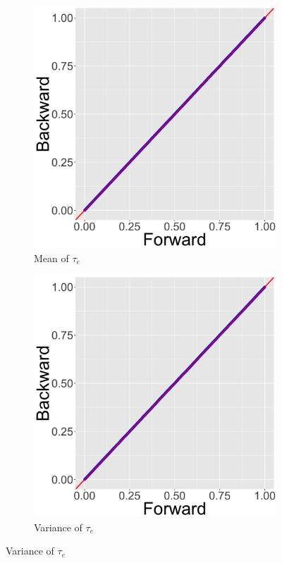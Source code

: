 \documentclass[ba]{imsart}
\numberwithin{equation}{section}
\theoremstyle{plain}
\begin{document}
\begin{figure}[!t]
\begin{subfigure}[b]{0.2425\textwidth}
			\end{subfigure}
			\begin{subfigure}[b]{0.2425\textwidth}
				\caption{Mean of $\tau_e$}
				\includegraphics[width=\textwidth]{img/plot3.png}	
			\end{subfigure}
			\begin{subfigure}[b]{0.2425\textwidth}
				\caption{Variance of $\tau_e$}
				\includegraphics[width=\textwidth]{img/plot4.png}	

\end{subfigure}
\end{figure}
\end{document}
